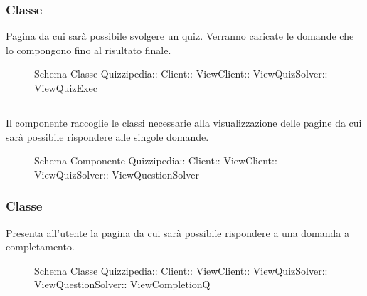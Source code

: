 \subsubsection{Classe }
Pagina da cui sarà possibile svolgere un quiz. Verranno caricate le domande che lo compongono fino al risultato finale.
\begin{figure}[H]
\centering
\noindent{}
\caption[Schema Classe ViewQuizExec]{Schema Classe Quizzipedia:: Client:: ViewClient:: ViewQuizSolver:: ViewQuizExec}
\end{figure}
\subsection{}
Il componente raccoglie le classi necessarie alla visualizzazione delle pagine da cui sarà possibile rispondere alle singole domande.
\begin{figure}[H]
\centering
\noindent{}
\caption[Schema Componente Quizzipedia::Client::ViewClient::ViewQuizSolver::ViewQuestionSolver]{Schema Componente Quizzipedia:: Client:: ViewClient:: ViewQuizSolver:: ViewQuestionSolver}
\end{figure}
\subsubsection{Classe }
Presenta all'utente la pagina da cui sarà possibile rispondere a una domanda a completamento.
\begin{figure}[H]
\centering
\noindent{}
\caption[Schema Classe ViewCompletionQ]{Schema Classe Quizzipedia:: Client:: ViewClient:: ViewQuizSolver:: ViewQuestionSolver:: ViewCompletionQ}
\end{figure}
